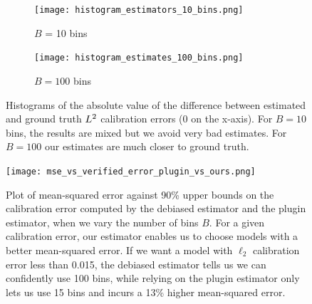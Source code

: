 \begin{figure}
  \centering
  \centering
     \begin{subfigure}[b]{0.45\textwidth}
         \centering
         \texttt{[image: histogram\_estimators\_10\_bins.png]}
         \caption{$B$ = 10 bins}
     \end{subfigure}
     \hfill
     \begin{subfigure}[b]{0.45\textwidth}
         \centering
         \texttt{[image: histogram\_estimates\_100\_bins.png]}
         \caption{$B = 100$ bins}
     \end{subfigure}
  \caption{Histograms of the absolute value of the difference between estimated and ground truth $L^2$ calibration errors ($0$ on the x-axis). For $B = 10$ bins, the results are mixed but we avoid very bad estimates. For $B=100$ our estimates are much closer to ground truth.}
  \label{fig:histograms_estimators_bins}
\end{figure}

\begin{figure}
  \centering
  \texttt{[image: mse\_vs\_verified\_error\_plugin\_vs\_ours.png]}
  \caption{Plot of mean-squared error against 90\% upper bounds on the calibration error computed by the debiased estimator and the plugin estimator, when we vary the number of bins $B$. For a given calibration error, our estimator enables us to choose models with a better mean-squared error. If we want a model with $\ell_2$ calibration error less than 0.015, the debiased estimator tells us we can confidently use 100 bins, while relying on the plugin estimator only lets us use 15 bins and incurs a 13\% higher mean-squared error.}
  \label{fig:mse_vs_ce_estimator}
\end{figure}

